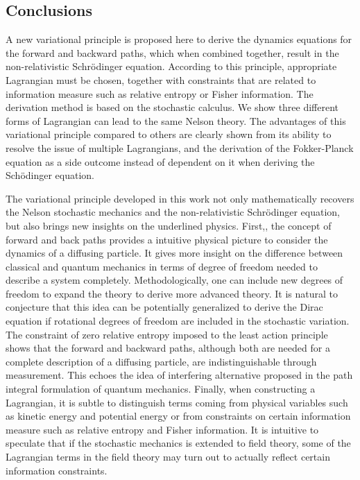 \documentclass[%
 aip, 
 amsmath,amssymb,amsthm,
 nofootinbib,
 reprint,
]{revtex4-1}
\begin{document}
\subsection{Conclusions}
A new variational principle is proposed here to derive the dynamics equations for the forward and backward paths, which when combined together, result in the non-relativistic Schr\"{o}dinger equation. According to this principle, appropriate Lagrangian must be chosen, together with constraints that are related to information measure such as relative entropy or Fisher information. The derivation method is based on the stochastic calculus. We show three different forms of Lagrangian can lead to the same Nelson theory. The advantages of this variational principle compared to others are clearly shown from its ability to resolve the issue of multiple Lagrangians, and the derivation of the Fokker-Planck equation as a side outcome instead of dependent on it when deriving the Sch\"{o}dinger equation.

The variational principle developed in this work not only mathematically recovers the Nelson stochastic mechanics and the non-relativistic Schr\"{o}dinger equation, but also brings new insights on the underlined physics. First,, the concept of forward and back paths provides a intuitive physical picture to consider the dynamics of a diffusing particle. It gives more insight on the difference between classical and quantum mechanics in terms of degree of freedom needed to describe a system completely. Methodologically, one can include new degrees of freedom to expand the theory to derive more advanced theory. It is natural to conjecture that this idea can be potentially generalized to derive the Dirac equation if rotational degrees of freedom are included in the stochastic variation. The constraint of zero relative entropy imposed to the least action principle shows that the forward and backward paths, although both are needed for a complete description of a diffusing particle, are indistinguishable through measurement. This echoes the idea of interfering alternative proposed in the path integral formulation of quantum mechanics. Finally, when constructing a Lagrangian, it is subtle to distinguish terms coming from physical variables such as kinetic energy and potential energy or from constraints on certain information measure such as relative entropy and Fisher information. It is intuitive to speculate that if the stochastic mechanics is extended to field theory, some of the Lagrangian terms in the field theory may turn out to actually reflect certain information constraints. 
\end{document}
